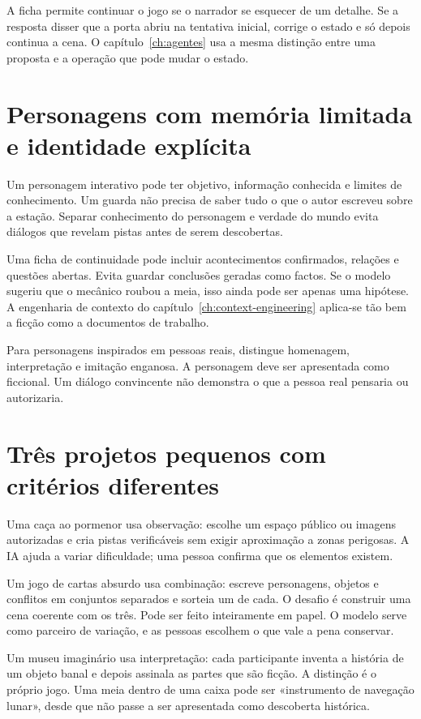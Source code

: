 A ficha permite continuar o jogo se o narrador se esquecer de um detalhe. Se a resposta disser que a porta abriu na tentativa inicial, corrige o estado e só depois continua a cena. O capítulo~\ref{ch:agentes} usa a mesma distinção entre uma proposta e a operação que pode mudar o estado.

\section{Personagens com memória limitada e identidade explícita}
Um personagem interativo pode ter objetivo, informação conhecida e limites de conhecimento. Um guarda não precisa de saber tudo o que o autor escreveu sobre a estação. Separar conhecimento do personagem e verdade do mundo evita diálogos que revelam pistas antes de serem descobertas.

Uma ficha de continuidade pode incluir acontecimentos confirmados, relações e questões abertas. Evita guardar conclusões geradas como factos. Se o modelo sugeriu que o mecânico roubou a meia, isso ainda pode ser apenas uma hipótese. A engenharia de contexto do capítulo~\ref{ch:context-engineering} aplica-se tão bem a ficção como a documentos de trabalho.

Para personagens inspirados em pessoas reais, distingue homenagem, interpretação e imitação enganosa. A personagem deve ser apresentada como ficcional. Um diálogo convincente não demonstra o que a pessoa real pensaria ou autorizaria.

\section{Três projetos pequenos com critérios diferentes}
Uma caça ao pormenor usa observação: escolhe um espaço público ou imagens autorizadas e cria pistas verificáveis sem exigir aproximação a zonas perigosas. A IA ajuda a variar dificuldade; uma pessoa confirma que os elementos existem.

Um jogo de cartas absurdo usa combinação: escreve personagens, objetos e conflitos em conjuntos separados e sorteia um de cada. O desafio é construir uma cena coerente com os três. Pode ser feito inteiramente em papel. O modelo serve como parceiro de variação, e as pessoas escolhem o que vale a pena conservar.

Um museu imaginário usa interpretação: cada participante inventa a história de um objeto banal e depois assinala as partes que são ficção. A distinção é o próprio jogo. Uma meia dentro de uma caixa pode ser «instrumento de navegação lunar», desde que não passe a ser apresentada como descoberta histórica.

